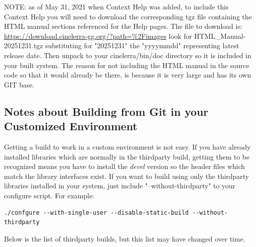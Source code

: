 NOTE: as of May 31, 2021 when Context Help was added, to include
this Context Help you will need to download the corresponding
tgz file containing the HTML manual sections referenced for the
Help pages.  The file to download is:
\url{https://download.cinelerra-gg.org/?path=\%2Fimages} look for HTML\_Manual-20251231.tgz
substituting for "20251231" the "yyyymmdd" representing latest release date.
Then unpack to your cinelerra/bin/doc directory so it is included in
your built system.  The reason for not including the HTML manual in 
the source code so that it would already be there, is because it is
very large and has its own GIT base.

\subsection{Notes about Building from Git in your Customized Environment}%
\label{sub:notes_about_building_from_git_in_your_customized_environment}

Getting a build to work in a custom environment is not easy.  If you
have already installed libraries which are normally in the
thirdparty build, getting them to be recognized means you have to
install the \textit{devel} version so the header files which match
the library interfaces exist. If you want to build using only the
thirdparty libraries installed in your system, just include 
"--without-thirdparty" to your configure script.  For example:
\begin{lstlisting}[style=sh]
./confgure --with-single-user --disable-static-build --without-thirdparty
\end{lstlisting}
Below is the list of thirdparty
builds, but this list may have changed over time.

